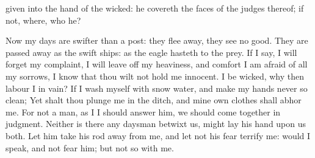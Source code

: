 {given into the
hand of the
wicked: he
covereth the
faces of the
judges thereof; if not,
where,
{} who
{} he?
\par }{\PP {}Now my
days are
swifter than a
post: they flee
away, they
see no
good.
They are passed
away
as the
swift
ships: as the
eagle
{}
hasteth to the
prey.
If I
say, I will
forget my
complaint, I will leave
off my
heaviness, and
comfort
{}
I am
afraid of all my
sorrows, I
know that thou wilt not hold me
innocent.
 I be
wicked, why then
labour I in
vain?
If I
wash myself
with snow
water, and make my
hands
never so
clean;
Yet shalt thou
plunge me in the
ditch, and mine own
clothes shall
abhor me.
For
{} not a
man, as I
{} I should
answer him,
{} we should
come
together in
judgment.
Neither
is there any
daysman betwixt us,
{} might
lay his
hand upon us
both.
Let him
take his
rod
away from me, and let not his
fear
terrify me:
 would I
speak, and not
fear him; but
{} not so with me.

}
